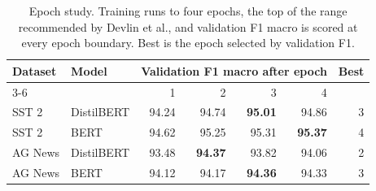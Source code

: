 \begin{table}[t]
\centering
\footnotesize
\caption{Epoch study. Training runs to four epochs, the top of the range recommended by Devlin et al., and validation F1 macro is scored at every epoch boundary. Best is the epoch selected by validation F1.}
\label{tab:epochs}
\begin{tabular}{llrrrrr}
\toprule
Dataset & Model & \multicolumn{4}{c}{Validation F1 macro after epoch} & Best \\
\cmidrule(lr){3-6}
 &  & 1 & 2 & 3 & 4 &  \\
\midrule
SST 2 & DistilBERT & 94.24 & 94.74 & \textbf{95.01} & 94.86 & 3 \\
SST 2 & BERT & 94.62 & 95.25 & 95.31 & \textbf{95.37} & 4 \\
\addlinespace
AG News & DistilBERT & 93.48 & \textbf{94.37} & 93.82 & 94.06 & 2 \\
AG News & BERT & 94.12 & 94.17 & \textbf{94.36} & 94.33 & 3 \\
\bottomrule
\end{tabular}
\end{table}

